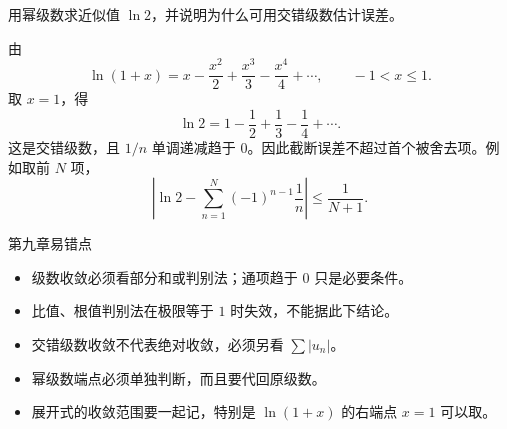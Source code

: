 \begin{problem}
用幂级数求近似值 $\ln 2$，并说明为什么可用交错级数估计误差。
\end{problem}
\begin{solution}
由
\[
  \ln(1+x)=x-\frac{x^2}{2}+\frac{x^3}{3}-\frac{x^4}{4}+\cdots,
  \qquad -1<x\le1.
\]
取 $x=1$，得
\[
  \ln2=1-\frac12+\frac13-\frac14+\cdots.
\]
这是交错级数，且 $1/n$ 单调递减趋于 $0$。因此截断误差不超过首个被舍去项。例如取前 $N$ 项，
\[
  \left|\ln2-\sum_{n=1}^{N}(-1)^{n-1}\frac1n\right|\le\frac1{N+1}.
\]
\end{solution}

\begin{warningbox}{第九章易错点}
\begin{itemize}
  \item 级数收敛必须看部分和或判别法；通项趋于 $0$ 只是必要条件。
  \item 比值、根值判别法在极限等于 $1$ 时失效，不能据此下结论。
  \item 交错级数收敛不代表绝对收敛，必须另看 $\sum |u_n|$。
  \item 幂级数端点必须单独判断，而且要代回原级数。
  \item 展开式的收敛范围要一起记，特别是 $\ln(1+x)$ 的右端点 $x=1$ 可以取。
\end{itemize}
\end{warningbox}

